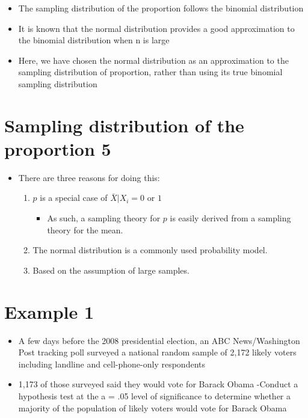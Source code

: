 \documentclass[12pt]{article}
\begin{document}
\begin{itemize}
\itemsep1pt\parskip0pt
\item
  The sampling distribution of the proportion follows the binomial
  distribution
\item
  It is known that the normal distribution provides a good approximation
  to the binomial distribution when n is large
\item
  Here, we have chosen the normal distribution as an approximation to
  the sampling distribution of proportion, rather than using its true
  binomial sampling distribution
\end{itemize}

\section{Sampling distribution of the proportion
5}\label{sampling-distribution-of-the-proportion-5}

\begin{itemize}
\itemsep1pt\parskip0pt
\item
  There are three reasons for doing this:

  \begin{enumerate}
  \def\labelenumi{\arabic{enumi}.}
  \itemsep1pt\parskip0pt
  \item
    \(p\) is a special case of \(\bar{X} | X_{i} = {0 \mbox{ or } 1}\)

    \begin{itemize}
    \itemsep1pt\parskip0pt
    \item
      As such, a sampling theory for \(p\) is easily derived from a
      sampling theory for the mean.
    \end{itemize}
  \item
    The normal distribution is a commonly used probability model.
  \item
    Based on the assumption of large samples.
  \end{enumerate}
\end{itemize}

\section{Example 1}\label{example-1}

\begin{itemize}
\itemsep1pt\parskip0pt
\item
  A few days before the 2008 presidential election, an ABC
  News/Washington Post tracking poll surveyed a national random sample
  of 2,172 likely voters including landline and cell-phone-only
  respondents
\item
  1,173 of those surveyed said they would vote for Barack Obama -Conduct
  a hypothesis test at the a = .05 level of significance to determine
  whether a majority of the population of likely voters would vote for
  Barack Obama
\end{itemize}
\end{document}

